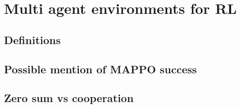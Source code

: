 \chapter{Multi agent environments for RL}

\section{Definitions}

\section{Possible mention of MAPPO success}
\section{Zero sum vs cooperation}

